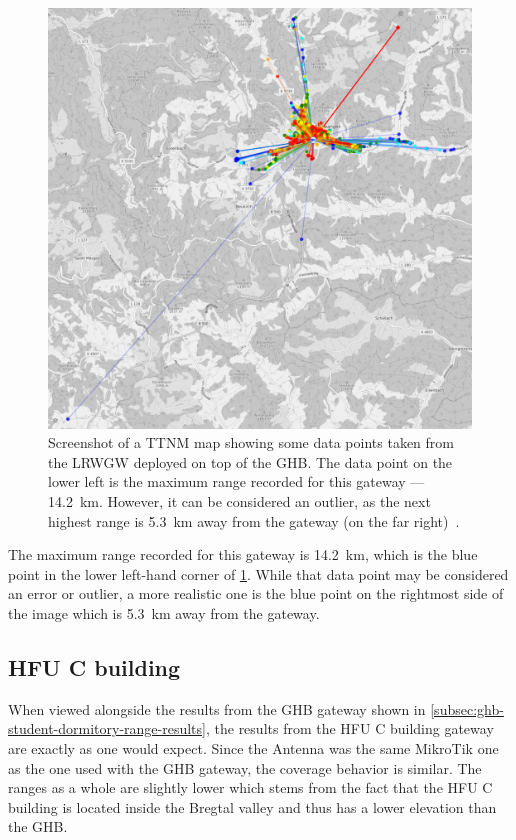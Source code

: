 \begin{figure}[htbp]
    \centering
    \includegraphics[width=1\textwidth]{pictures/ttn-mapper/gateway-ranges/ghb_mikrotik_gw_range.png}
    \caption{
        Screenshot of a \ac{TTNM} map showing some data points taken from the \acl{LRWGW} deployed on top of the \ac{GHB}.
        The data point on the lower left is the maximum range recorded for this gateway --- \SI{14.2}{\kilo\meter}.
        However, it can be considered an outlier, as the next highest range is \SI{5.3}{\kilo\meter} away from the gateway (on the far right)~\cite{ttn_mapper_ttn_2023}.
    }\label{pic:ghb_mikrotik_gw_range}
\end{figure}

The maximum range recorded for this gateway is \SI{14.2}{\kilo\meter}, which is the blue point in the lower left-hand corner of \cref{pic:ghb_mikrotik_gw_range}.
While that data point may be considered an error or outlier, a more realistic one is the blue point on the rightmost side of the image which is \SI{5.3}{\kilo\meter} away from the gateway.

\subsection{\acl{HFU} C building}

When viewed alongside the results from the \ac{GHB} gateway shown in \cref{subsec:ghb-student-dormitory-range-results}, the results from the \ac{HFU} C building gateway are exactly as one would expect.
Since the Antenna was the same MikroTik one as the one used with the \ac{GHB} gateway, the coverage behavior is similar.
The ranges as a whole are slightly lower which stems from the fact that the \ac{HFU} C building is located inside the Bregtal valley and thus has a lower elevation than the \ac{GHB}.

